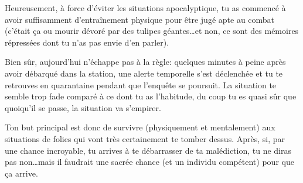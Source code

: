 {	\par Heureusement, à force d'éviter les situations apocalyptique, tu as commencé à avoir suffisamment d'entraînement physique pour être jugé apte au combat (c'était ça ou mourir dévoré par des tulipes géantes\dots et non, ce sont des mémoires répressées dont tu n'as pas envie d'en parler).
	
	\par Bien sûr, aujourd'hui n'échappe pas à la règle: quelques minutes à peine après avoir débarqué dans la station, une alerte temporelle s'est déclenchée et tu te retrouves en quarantaine pendant que l'enquête se poursuit. La situation te semble trop fade comparé à ce dont tu as l'habitude, du coup tu es quasi sûr que quoiqu'il se passe, la situation va s'empirer.
	
	\par Ton but principal est donc de survivre (physiquement et mentalement) aux situations de folies qui vont très certainement te tomber dessus. Après, si, par une chance incroyable, tu arrives à te débarrasser de ta malédiction, tu ne diras pas non\dots mais il faudrait une sacrée chance (et un individu compétent) pour que ça arrive.
}



